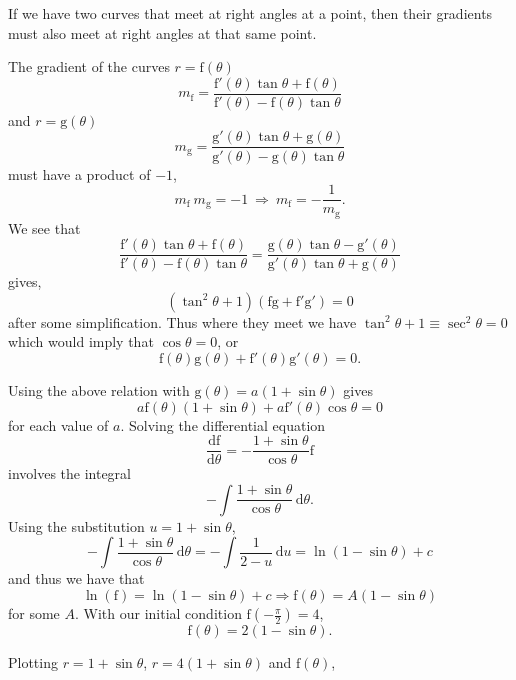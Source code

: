 \documentclass{article}
\newcommand{\der}[2]{\frac{\mathrm{d}#1}{\mathrm{d}#2}}
\begin{document}
\vspace{0.2cm}

If we have two curves that meet at right angles at a point, then their gradients must also meet at right angles at that same point.\par 
\quad The gradient of the curves $r=\mathrm{f}(\theta)$
\[
m_{\mathrm{f}}= \frac{\mathrm{f}'(\theta)\tan\theta + \mathrm{f}(\theta)}{\mathrm{f}'(\theta)-\mathrm{f}(\theta)\tan\theta}
\]
and $r=\mathrm{g}(\theta)$
\[
m_{\mathrm{g}} = \frac{\mathrm{g}'(\theta)\tan\theta + \mathrm{g}(\theta)}{\mathrm{g}'(\theta)-\mathrm{g}(\theta)\tan\theta}
\]
must have a product of $-1$, 
\[
m_{\mathrm{f}} \ m_{\mathrm{g}}= -1 \ \Rightarrow \ m_{\mathrm{f}}= -\frac{1}{m_{\mathrm{g}}}.
\]
We see that
\[
\frac{\mathrm{f}'(\theta)\tan\theta + \mathrm{f}(\theta)}{\mathrm{f}'(\theta)-\mathrm{f}(\theta)\tan\theta} = 
\frac{\mathrm{g}(\theta)\tan \theta - \mathrm{g}'(\theta)}{\mathrm{g}'(\theta)\tan \theta + \mathrm{g}(\theta)}
\]
gives,
\[
\left(\tan^2\theta + 1\right) \left(\mathrm{f}\mathrm{g} + \mathrm{f}'\mathrm{g}' \right)=0
\]
after some simplification. Thus where they meet we have  $\tan^2 \theta + 1 \equiv \sec^2\theta=0$ which would imply that $\cos \theta =0$, or 
\[
\mathrm{f}(\theta)\mathrm{g}(\theta) + \mathrm{f}'(\theta)\mathrm{g}'(\theta)=0.
\]

\vspace{0.2cm}

Using the above relation with $\mathrm{g}(\theta) = a(1+\sin\theta)$ gives
\[
a\mathrm{f}(\theta)(1+\sin\theta) + a\mathrm{f}'(\theta)\cos\theta=0
\]
for each value of $a$. Solving the differential equation
\[
\der{\mathrm{f}}{\theta} = -\frac{1+\sin\theta}{\cos \theta}\mathrm{f}
\]
involves the integral 
\[
-\int \frac{1+\sin\theta}{\cos \theta}\,\mathrm{d}\theta.
\]
Using the substitution $u = 1+\sin\theta$,
\[
-\int \frac{1+\sin\theta}{\cos \theta}\,\mathrm{d}\theta = -\int \frac{1}{2-u}\,\mathrm{d}u = \ln(1-\sin\theta) + c
\]
and thus we have that 
\[
\ln(\mathrm{f}) = \ln(1-\sin \theta) + c \Rightarrow \mathrm{f}(\theta) = A(1-\sin\theta)
\]
for some $A$. With our initial condition $\mathrm{f}(-\frac{\pi}{2})=4$,
\[
\mathrm{f}(\theta) = 2(1-\sin \theta).
\]

Plotting $r=1+\sin\theta$, $r= 4(1+\sin\theta)$ and $\mathrm{f}(\theta)$,

\begin{figure}[h!]
\centering
{}
\end{figure}
\end{document}
